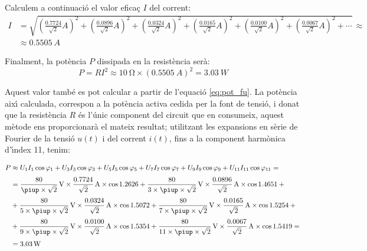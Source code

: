 \begin{exemple}
    Calculem a continuaci\'{o} el valor efica\c{c} $I$ del corrent:
    \[\begin{split}
        I &= \sqrt{\left(\tfrac{\num{0,7724}}{\sqrt{2}}\unit{A}\right)^2 +
            \left(\tfrac{\num{0,0896}}{\sqrt{2}}\unit{A}\right)^2 +
            \left(\tfrac{\num{0,0324}}{\sqrt{2}}\unit{A}\right)^2 +
            \left(\tfrac{\num{0,0165}}{\sqrt{2}}\unit{A}\right)^2 +
            \left(\tfrac{\num{0,0100}}{\sqrt{2}}\unit{A}\right)^2 +
            \left(\tfrac{\num{0,0067}}{\sqrt{2}}\unit{A}\right)^2 + \cdots}
            \,\approx \\[1ex]
            &\approx \SI{0,5505}{A}
    \end{split}\]

    Finalment, la pot\`{e}ncia $P$ dissipada en la resist\`{e}ncia ser\`{a}:
    \[
        P = R I^2 \approx \SI{10}{\ohm} \times (\SI{0,5505}{A})^2 =
        \SI{3,03}{W}
    \]

    Aquest valor tamb\'{e} es pot calcular a partir de l'equaci\'{o}
    \eqref{eq:pot_fu}. La pot\`{e}ncia aix\'{\i} calculada, correspon a la
    pot\`{e}ncia activa cedida per la font de tensi\'{o}, i donat que la
    resist\`{e}ncia $R$ \'{e}s l'\'{u}nic component del circuit que en consumeix,
    aquest m\`{e}tode ens proporcionar\`{a} el mateix resultat; utilitzant les
    expansions en s\`{e}rie de Fourier de la tensi\'{o} $u(t)$ i del corrent
    $i(t)$, fins a la component harm\`{o}nica d'\'{\i}ndex 11, tenim:

    \[\begin{split}
        P &\approx U_1 I_1 \cos\varphi_1 +  U_3 I_3 \cos\varphi_3 +
         U_5 I_5 \cos\varphi_5 + U_7 I_7 \cos\varphi_7 +
         U_9 I_9 \cos\varphi_9 + U_{11} I_{11} \cos\varphi_{11} = {}\\[0.7ex]
        &= \frac{80}{\piup\times\sqrt{2}}\unit{V} \times
        \frac{\num{0,7724}}{\sqrt{2}}\unit{A} \times \cos \num{1,2626} +
        \frac{80}{3\times\piup\times\sqrt{2}}\unit{V} \times
        \frac{\num{0,0896}}{\sqrt{2}}\unit{A} \times \cos \num{1,4651} + {} \\[0.7ex]
        &+ \frac{80}{5\times\piup\times\sqrt{2}}\unit{V} \times
        \frac{\num{0,0324}}{\sqrt{2}}\unit{A} \times \cos \num{1,5072} +
        \frac{80}{7\times\piup\times\sqrt{2}}\unit{V} \times
        \frac{\num{0,0165}}{\sqrt{2}}\unit{A} \times \cos \num{1,5254} + {}\\[0.7ex]
        &+ \frac{80}{9\times\piup\times\sqrt{2}}\unit{V} \times
        \frac{\num{0,0100}}{\sqrt{2}}\unit{A} \times \cos \num{1,5354} +
        \frac{80}{11\times\piup\times\sqrt{2}}\unit{V} \times
        \frac{\num{0,0067}}{\sqrt{2}}\unit{A} \times \cos \num{1,5419}= {}\\[0.7ex]
        &= \SI{3,03}{W}
    \end{split}\]


\end{exemple}
